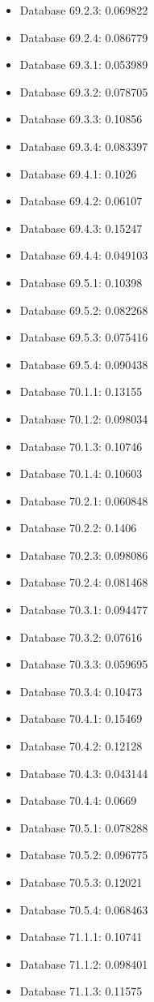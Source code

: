 \begin{itemize}
\item Database 69.2.3: 0.069822
\item Database 69.2.4: 0.086779
\item Database 69.3.1: 0.053989
\item Database 69.3.2: 0.078705
\item Database 69.3.3: 0.10856
\item Database 69.3.4: 0.083397
\item Database 69.4.1: 0.1026
\item Database 69.4.2: 0.06107
\item Database 69.4.3: 0.15247
\item Database 69.4.4: 0.049103
\item Database 69.5.1: 0.10398
\item Database 69.5.2: 0.082268
\item Database 69.5.3: 0.075416
\item Database 69.5.4: 0.090438
\item Database 70.1.1: 0.13155
\item Database 70.1.2: 0.098034
\item Database 70.1.3: 0.10746
\item Database 70.1.4: 0.10603
\item Database 70.2.1: 0.060848
\item Database 70.2.2: 0.1406
\item Database 70.2.3: 0.098086
\item Database 70.2.4: 0.081468
\item Database 70.3.1: 0.094477
\item Database 70.3.2: 0.07616
\item Database 70.3.3: 0.059695
\item Database 70.3.4: 0.10473
\item Database 70.4.1: 0.15469
\item Database 70.4.2: 0.12128
\item Database 70.4.3: 0.043144
\item Database 70.4.4: 0.0669
\item Database 70.5.1: 0.078288
\item Database 70.5.2: 0.096775
\item Database 70.5.3: 0.12021
\item Database 70.5.4: 0.068463
\item Database 71.1.1: 0.10741
\item Database 71.1.2: 0.098401
\item Database 71.1.3: 0.11575

\end{itemize}
